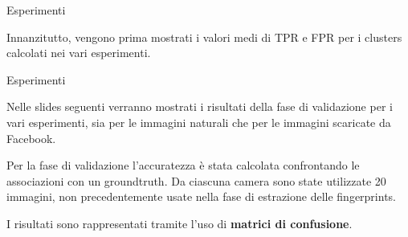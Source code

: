 \begin{tframe}{Esperimenti}

Innanzitutto, vengono prima mostrati i valori medi di TPR e FPR per i clusters calcolati nei vari esperimenti.

\begin{table}[ht]
\centering %
\label{table:nonlin} %
\end{table}

\end{tframe}

\begin{tframe}{Esperimenti}

Nelle slides seguenti verranno mostrati i risultati della fase di validazione per i vari esperimenti, sia per le immagini naturali che per le immagini scaricate da Facebook.

\vspace{0.2cm}

Per la fase di validazione l'accuratezza è stata calcolata confrontando le associazioni con un groundtruth. Da ciascuna camera sono state utilizzate 20 immagini, non precedentemente usate nella fase di estrazione delle fingerprints.

\vspace{0.2cm}

I risultati sono rappresentati tramite l'uso di \textbf{matrici di confusione}.

\end{tframe}

